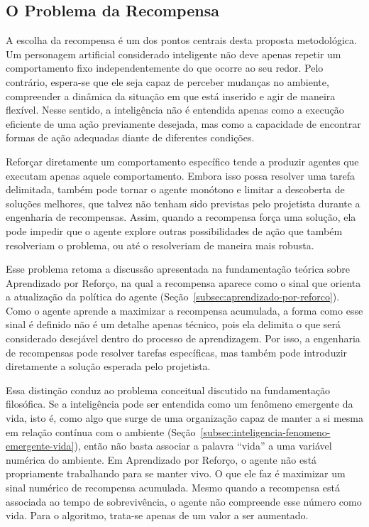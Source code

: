 \subsection{O Problema da Recompensa}
\label{subsec:problema-recompensa}

A escolha da recompensa é um dos pontos centrais desta proposta metodológica. Um personagem artificial considerado inteligente não deve apenas repetir um comportamento fixo independentemente do que ocorre ao seu redor. Pelo contrário, espera-se que ele seja capaz de perceber mudanças no ambiente, compreender a dinâmica da situação em que está inserido e agir de maneira flexível. Nesse sentido, a inteligência não é entendida apenas como a execução eficiente de uma ação previamente desejada, mas como a capacidade de encontrar formas de ação adequadas diante de diferentes condições.

Reforçar diretamente um comportamento específico tende a produzir agentes que executam apenas aquele comportamento. Embora isso possa resolver uma tarefa delimitada, também pode tornar o agente monótono e limitar a descoberta de soluções melhores, que talvez não tenham sido previstas pelo projetista durante a engenharia de recompensas. Assim, quando a recompensa força uma solução, ela pode impedir que o agente explore outras possibilidades de ação que também resolveriam o problema, ou até o resolveriam de maneira mais robusta.

Esse problema retoma a discussão apresentada na fundamentação teórica sobre Aprendizado por Reforço, na qual a recompensa aparece como o sinal que orienta a atualização da política do agente (Seção~\ref{subsec:aprendizado-por-reforco}). Como o agente aprende a maximizar a recompensa acumulada, a forma como esse sinal é definido não é um detalhe apenas técnico, pois ela delimita o que será considerado desejável dentro do processo de aprendizagem. Por isso, a engenharia de recompensas pode resolver tarefas específicas, mas também pode introduzir diretamente a solução esperada pelo projetista.

Essa distinção conduz ao problema conceitual discutido na fundamentação filosófica. Se a inteligência pode ser entendida como um fenômeno emergente da vida, isto é, como algo que surge de uma organização capaz de manter a si mesma em relação contínua com o ambiente (Seção~\ref{subsec:inteligencia-fenomeno-emergente-vida}), então não basta associar a palavra ``vida'' a uma variável numérica do ambiente. Em Aprendizado por Reforço, o agente não está propriamente trabalhando para se manter vivo. O que ele faz é maximizar um sinal numérico de recompensa acumulada. Mesmo quando a recompensa está associada ao tempo de sobrevivência, o agente não compreende esse número como vida. Para o algoritmo, trata-se apenas de um valor a ser aumentado.

